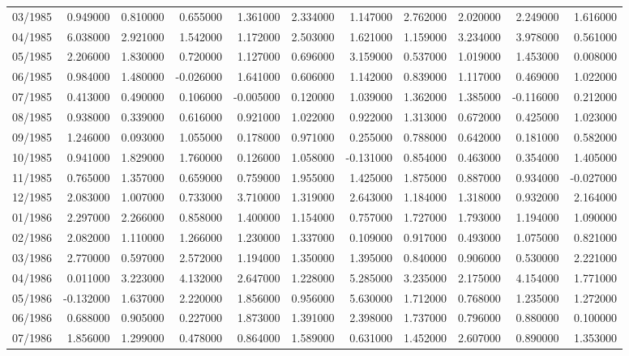 \begin{tabular}{lrrrrrrrrrr}
03/1985 & 0.949000 & 0.810000 & 0.655000 & 1.361000 & 2.334000 & 1.147000 & 2.762000 & 2.020000 & 2.249000 & 1.616000 \\
04/1985 & 6.038000 & 2.921000 & 1.542000 & 1.172000 & 2.503000 & 1.621000 & 1.159000 & 3.234000 & 3.978000 & 0.561000 \\
05/1985 & 2.206000 & 1.830000 & 0.720000 & 1.127000 & 0.696000 & 3.159000 & 0.537000 & 1.019000 & 1.453000 & 0.008000 \\
06/1985 & 0.984000 & 1.480000 & -0.026000 & 1.641000 & 0.606000 & 1.142000 & 0.839000 & 1.117000 & 0.469000 & 1.022000 \\
07/1985 & 0.413000 & 0.490000 & 0.106000 & -0.005000 & 0.120000 & 1.039000 & 1.362000 & 1.385000 & -0.116000 & 0.212000 \\
08/1985 & 0.938000 & 0.339000 & 0.616000 & 0.921000 & 1.022000 & 0.922000 & 1.313000 & 0.672000 & 0.425000 & 1.023000 \\
09/1985 & 1.246000 & 0.093000 & 1.055000 & 0.178000 & 0.971000 & 0.255000 & 0.788000 & 0.642000 & 0.181000 & 0.582000 \\
10/1985 & 0.941000 & 1.829000 & 1.760000 & 0.126000 & 1.058000 & -0.131000 & 0.854000 & 0.463000 & 0.354000 & 1.405000 \\
11/1985 & 0.765000 & 1.357000 & 0.659000 & 0.759000 & 1.955000 & 1.425000 & 1.875000 & 0.887000 & 0.934000 & -0.027000 \\
12/1985 & 2.083000 & 1.007000 & 0.733000 & 3.710000 & 1.319000 & 2.643000 & 1.184000 & 1.318000 & 0.932000 & 2.164000 \\
01/1986 & 2.297000 & 2.266000 & 0.858000 & 1.400000 & 1.154000 & 0.757000 & 1.727000 & 1.793000 & 1.194000 & 1.090000 \\
02/1986 & 2.082000 & 1.110000 & 1.266000 & 1.230000 & 1.337000 & 0.109000 & 0.917000 & 0.493000 & 1.075000 & 0.821000 \\
03/1986 & 2.770000 & 0.597000 & 2.572000 & 1.194000 & 1.350000 & 1.395000 & 0.840000 & 0.906000 & 0.530000 & 2.221000 \\
04/1986 & 0.011000 & 3.223000 & 4.132000 & 2.647000 & 1.228000 & 5.285000 & 3.235000 & 2.175000 & 4.154000 & 1.771000 \\
05/1986 & -0.132000 & 1.637000 & 2.220000 & 1.856000 & 0.956000 & 5.630000 & 1.712000 & 0.768000 & 1.235000 & 1.272000 \\
06/1986 & 0.688000 & 0.905000 & 0.227000 & 1.873000 & 1.391000 & 2.398000 & 1.737000 & 0.796000 & 0.880000 & 0.100000 \\
07/1986 & 1.856000 & 1.299000 & 0.478000 & 0.864000 & 1.589000 & 0.631000 & 1.452000 & 2.607000 & 0.890000 & 1.353000 \\

\end{tabular}
